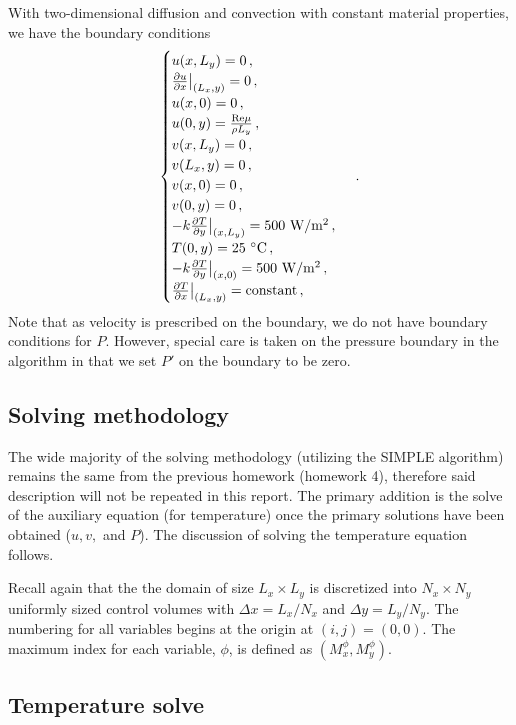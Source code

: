 \documentclass{article}
\begin{document}
With two-dimensional diffusion and convection with constant material properties, we have the boundary conditions
\begin{equation}
\begin{cases}
u(x, L_y) = 0\,, \\
\pdv{u}{x} \big|_{(L_x, y)} = 0 \,, \\
u(x, 0) = 0 \,, \\
u(0, y) = \frac{\mathrm{Re} \mu}{\rho L_y} \,, \\
v(x, L_y) = 0\,, \\
v(L_x, y) = 0 \,, \\
v(x, 0) = 0\,, \\
v(0, y) = 0 \,,\\
-k\pdv{T}{y} \big|_{(x, L_y)} = 500~\text{W}/\text{m}^2\,,\\
T(0, y) = 25~^\circ\text{C}\,, \\
-k\pdv{T}{y} \big|_{(x, 0)} = 500~\text{W}/\text{m}^2\,,\\
\pdv{T}{x}\big|_{(L_x, y)} = \text{constant}\,,
\end{cases}\,.
\end{equation}
Note that as velocity is prescribed on the boundary, we do not have boundary conditions for $P$. However, special care is taken on the pressure boundary in the algorithm in that we set $P'$ on the boundary to be zero.

\subsection{Solving methodology}

The wide majority of the solving methodology (utilizing the SIMPLE algorithm) remains the same from the previous homework (homework 4), therefore said description will not be repeated in this report. The primary addition is the solve of the auxiliary equation (for temperature) once the primary solutions have been obtained ($u, v,$ and $P$). The discussion of solving the temperature equation follows.

Recall again that the the domain of size $L_x \times L_y$ is discretized into $N_x \times N_y$ uniformly sized control volumes with $\Delta x = L_x / N_x$ and $\Delta y = L_y / N_y$. The numbering for all variables begins at the origin at $(i, j) = (0, 0)$. The maximum index for each variable, $\phi$, is defined as $(M_x^\phi, M_y^\phi)$.

\subsection{Temperature solve}
\end{document}
